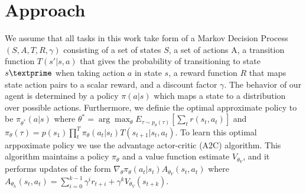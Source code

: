 \section{Approach}
We assume that all tasks in this work take form of a Markov Decision Process $(S, A, T, R, \gamma)$ consisting of
a set of states $S$, a set of actions A, a transition function $T(s' \vert s, a)$ that gives the
probability of transitioning to state $s \textprime$ when taking action $a$ in state $s$, a reward function
$R$ that maps state action pairs to a scalar reward, and a discount factor $\gamma$. The behavior of our
agent is determined by a policy $\pi(a \vert s)$ which maps a state to a distribution over possible actions.
Furthermore, we definie the optimal approximate policy to be $\pi_{\theta^*}(a \vert s)$ where
$\theta^* = \arg\max_{\theta} E_{\tau \sim p_\theta(\tau)}[\sum_t r(s_t, a_t)]$ and
$\pi_\theta(\tau) = p(s_1) \prod_t^T \pi_\theta(a_t \vert s_t)T(s_{t+1} \vert s_t, a_t)$.
To learn this optimal arppoximate policy we use the advantage actor-critic (A2C) algorithm.
This algorithm maintains a policy $\pi_\theta$ and a value function estimate $V_{\theta_V}$,
and it performs updates of the form $\nabla_\theta \pi_\theta(a_t \vert s_t)A_{\theta_V}(s_t, a_t)$
where $A_{\theta_h}(s_t, a_t) = \sum_{i=0}^{k-1} \gamma^ir_{t+i} + \gamma^kV_{\theta_V}(s_{t+k})$.
